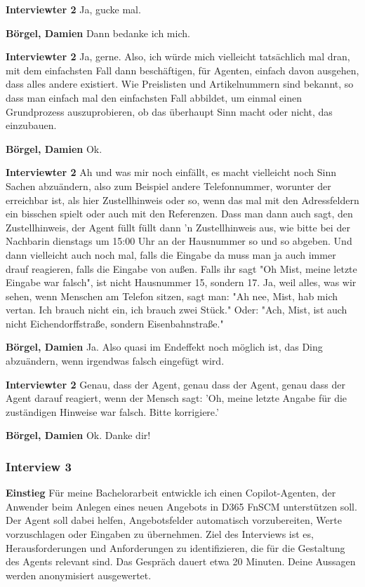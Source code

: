 \textbf{Interviewter 2}\newline
Ja, gucke mal.

\textbf{Börgel, Damien}\newline
Dann bedanke ich mich.

\textbf{Interviewter 2}\newline
Ja, gerne. Also, ich würde mich vielleicht tatsächlich mal dran, mit dem einfachsten Fall dann beschäftigen, für Agenten, einfach davon ausgehen, dass alles andere existiert.
Wie Preislisten und Artikelnummern sind bekannt, so dass man einfach mal den einfachsten Fall abbildet, um einmal einen Grundprozess auszuprobieren, ob das überhaupt Sinn macht oder nicht, das einzubauen.

\textbf{Börgel, Damien}\newline
Ok.

\textbf{Interviewter 2}\newline
Ah und was mir noch einfällt, es macht vielleicht noch Sinn Sachen abzuändern, also zum Beispiel andere Telefonnummer, worunter der erreichbar ist, als hier Zustellhinweis oder so, wenn das mal mit den Adressfeldern ein bisschen spielt oder auch mit den Referenzen. 
Dass man dann auch sagt, den Zustellhinweis, der Agent füllt füllt dann 'n Zustellhinweis aus, wie bitte bei der Nachbarin dienstags um 15:00 Uhr an der Hausnummer so und so abgeben.
Und dann vielleicht auch noch mal, falls die Eingabe da muss man ja auch immer drauf reagieren, falls die Eingabe von außen.
Falls ihr sagt "Oh Mist, meine letzte Eingabe war falsch", ist nicht Hausnummer 15, sondern 17.
Ja, weil alles, was wir sehen, wenn Menschen am Telefon sitzen, sagt man: "Ah nee, Mist, hab mich vertan. Ich brauch nicht ein, ich brauch zwei Stück." Oder: "Ach, Mist, ist auch nicht Eichendorffstraße, sondern Eisenbahnstraße."

\textbf{Börgel, Damien}\newline
Ja.
Also quasi im Endeffekt noch möglich ist, das Ding abzuändern, wenn irgendwas falsch eingefügt wird.

\textbf{Interviewter 2}\newline
Genau, dass der Agent, genau dass der Agent, genau dass der Agent darauf reagiert, wenn der Mensch sagt: 'Oh, meine letzte Angabe für die zuständigen Hinweise war falsch. Bitte korrigiere.'

\textbf{Börgel, Damien}\newline
Ok. Danke dir!

\subsubsection{Interview 3}
\label{anhang:i3}
\textbf{Einstieg}\newline
Für meine Bachelorarbeit entwickle ich einen Copilot-Agenten, der Anwender beim Anlegen eines neuen Angebots in D365 FnSCM unterstützen soll.
Der Agent soll dabei helfen, Angebotsfelder automatisch vorzubereiten, Werte vorzuschlagen oder Eingaben zu übernehmen.
Ziel des Interviews ist es, Herausforderungen und Anforderungen zu identifizieren, die für die Gestaltung des Agents relevant sind.
Das Gespräch dauert etwa 20 Minuten. Deine Aussagen werden anonymisiert ausgewertet.

